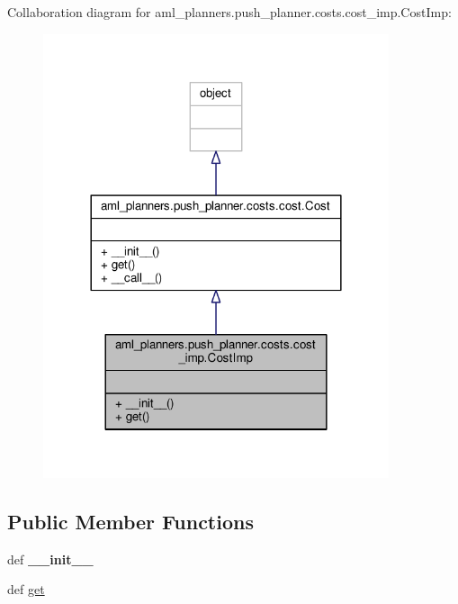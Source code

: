 Collaboration diagram for aml\-\_\-planners.\-push\-\_\-planner.\-costs.\-cost\-\_\-imp.\-Cost\-Imp\-:
\nopagebreak
\begin{figure}[H]
\begin{center}
\leavevmode
\includegraphics[width=288pt]{classaml__planners_1_1push__planner_1_1costs_1_1cost__imp_1_1_cost_imp__coll__graph}
\end{center}
\end{figure}
\subsection*{Public Member Functions}
\begin{DoxyCompactItemize}
\item 
\hypertarget{classaml__planners_1_1push__planner_1_1costs_1_1cost__imp_1_1_cost_imp_a9c5c0e23b4a17c2f58e1283cfc6ec972}{def {\bfseries \-\_\-\-\_\-init\-\_\-\-\_\-}}\label{classaml__planners_1_1push__planner_1_1costs_1_1cost__imp_1_1_cost_imp_a9c5c0e23b4a17c2f58e1283cfc6ec972}

\item 
def \hyperlink{classaml__planners_1_1push__planner_1_1costs_1_1cost__imp_1_1_cost_imp_a99286a64797ef0a7f6b916acf0ac9f18}{get}
\end{DoxyCompactItemize}


